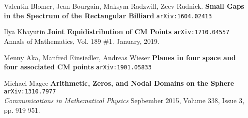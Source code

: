 \documentclass[12pt]{article}
\begin{document}
\begin{thebibliography}{}

\item Valentin Blomer, Jean Bourgain, Maksym Radzwill, Zeev Rudnick. \textbf{Small Gaps in the Spectrum of the Rectangular Billiard} \texttt{arXiv:1604.02413}

\item Ilya Khayutin \textbf{Joint Equidistribution of CM Points} \texttt{arXiv:1710.04557} \\
Annals of Mathematics,  Vol. 189 \#1.  January, 2019.

\item Menny Aka, Manfred Einsiedler, Andreas Wieser \textbf{Planes in four space and four associated CM points} \texttt{arXiv:1901.05833}

\item Michael Magee \textbf{Arithmetic, Zeros, and Nodal Domains on the Sphere} \texttt{arXiv:1310.7977} \\
\textit{Communications in Mathematical Physics} Sepbember 2015, Volume 338, Issue 3, pp. 919-951.

\end{thebibliography}
\end{document}
